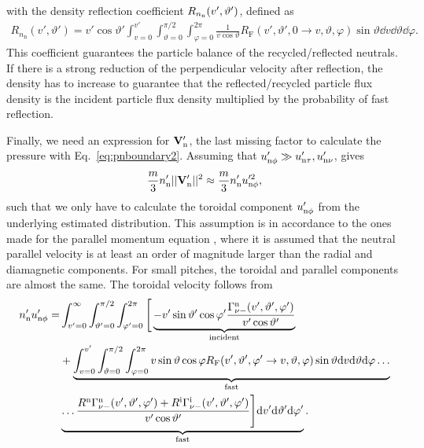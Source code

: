 with the density reflection coefficient $R_{n_{\mathrm{n}}}(v',\vartheta')$, defined as
\begin{align}
R_{n_{\mathrm{n}}}(v',\vartheta') = v' \cos \vartheta' \int_{v=0}^{v'} \int_{\vartheta=0}^{\pi/2} \int_{\varphi=0}^{2\pi} \frac{1}{v \cos \vartheta} R_{\mathrm{F}}(v',\vartheta',0 \rightarrow v,\vartheta,\varphi) \sin \vartheta \dd v \dd \vartheta \dd \varphi. \label{eq:Rnn}
\end{align}
This coefficient guarantees the particle balance of the recycled/reflected neutrals. If there is a strong reduction of the perpendicular velocity after reflection, the density has to increase to guarantee that the reflected/recycled particle flux density is the incident particle flux density multiplied by the probability of fast reflection.

Finally, we need an expression for ${\bf V}_{\mathrm{n}}'$, the last missing factor to calculate the pressure with Eq.~\eqref{eq:pnboundary2}. Assuming that $u_{\mathrm{n}\phi}' \gg u_{\mathrm{n}\tau}', u_{\mathrm{n}\nu}'$, gives
\begin{equation}
\frac{m}{3} n_{\mathrm{n}}' ||{\bf V}_{\mathrm{n}}'||^{2} \approx \frac{m}{3} n_{\mathrm{n}}' u_{\mathrm{n}\phi}'^{2}, \label{eq:pnboundary_term2}
\end{equation}
such that we only have to calculate the toroidal component $u_{\mathrm{n}\phi}'$ from the underlying estimated distribution. This assumption is in accordance to the ones made for the parallel momentum equation \cite{nf_niels}, where it is assumed that the neutral parallel velocity is at least an order of magnitude larger than the radial and diamagnetic components. For small pitches, the toroidal and parallel components are almost the same. The toroidal velocity follows from
\begin{align}
n_{\mathrm{n}}' u_{\mathrm{n}\phi}' =& \int_{v'=0}^{\infty} \int_{\vartheta'=0}^{\pi/2} \int_{\varphi'=0}^{2\pi} \Bigg [\underbrace{-v' \sin \vartheta' \cos \varphi' \frac{\Gamma_{\nu-}^{\mathrm{n}}(v',\vartheta',\varphi')}{v' \cos \vartheta'}}_{\text{incident}}  \nonumber \\
&+ \underbrace{\int_{v=0}^{v'} \int_{\vartheta=0}^{\pi/2} \int_{\varphi=0}^{2\pi} v \sin \vartheta \cos \varphi R_{\mathrm{F}}(v',\vartheta',\varphi' \rightarrow v,\vartheta,\varphi) \sin \vartheta \mathrm{d} v \mathrm{d} \vartheta \mathrm{d} \varphi  \ldots}_{\text{fast}} \nonumber \\
&\underbrace{ \ldots \frac{R^{\mathrm{n}} \Gamma_{\nu-}^{\mathrm{n}}(v',\vartheta',\varphi') + R^{\mathrm{i}} \Gamma_{\nu-}^{\mathrm{i}}(v',\vartheta',\varphi')}{v' \cos \vartheta'} \Bigg ] \mathrm{d} v' \mathrm{d} \vartheta' \mathrm{d} \varphi'}_{\text{fast}}. \label{eq:nnwwn}
\end{align}
